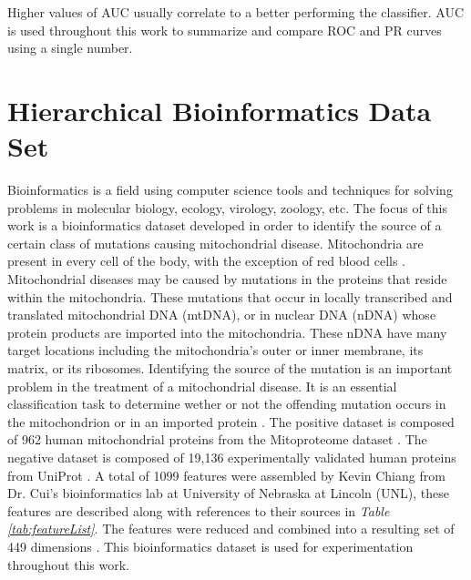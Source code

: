 \documentclass[ms]{nuthesis}
\begin{document}
 Higher values of AUC usually correlate to a better performing the classifier. AUC is used throughout
 this work to summarize and compare ROC and PR curves using a single number.









\section{Hierarchical Bioinformatics Data Set}
\par Bioinformatics is a field using computer science tools and techniques
for solving problems in molecular biology, ecology, virology, zoology, etc.
The focus of this work is
a bioinformatics dataset developed in order to identify the source of
a certain class of mutations causing mitochondrial disease. Mitochondria are
present in every cell of the body, with the exception of red blood cells
\cite{bioPoster}. Mitochondrial diseases may be caused by mutations
in the proteins that reside within the mitochondria. These mutations that
occur in locally transcribed and translated mitochondrial DNA (mtDNA), or
in nuclear DNA (nDNA) whose protein products are imported into the
mitochondria. These nDNA have many target locations including the mitochondria's
outer or inner membrane, its matrix, or its ribosomes. Identifying the
source of the mutation is an important problem in the treatment of a
mitochondrial disease. It is an essential classification task to determine
wether or not the offending mutation occurs in the mitochondrion or in
an imported protein \cite{bioPoster}. The positive dataset is composed of 962
human mitochondrial proteins from the Mitoproteome dataset \cite{mitoproteome}.
The negative dataset is composed of 19,136 experimentally validated human
 proteins from UniProt \cite{UniProt}. A total of 1099 features were assembled
 by Kevin Chiang from Dr. Cui's bioinformatics lab at University of Nebraska
 at Lincoln (UNL), these features are described along with references to their
 sources in \textit{Table \ref{tab:featureList}}. The features were reduced and
  combined into a resulting set of 449 dimensions \cite{bioPoster}. This
  bioinformatics dataset is used for experimentation throughout this work.
\end{document}
